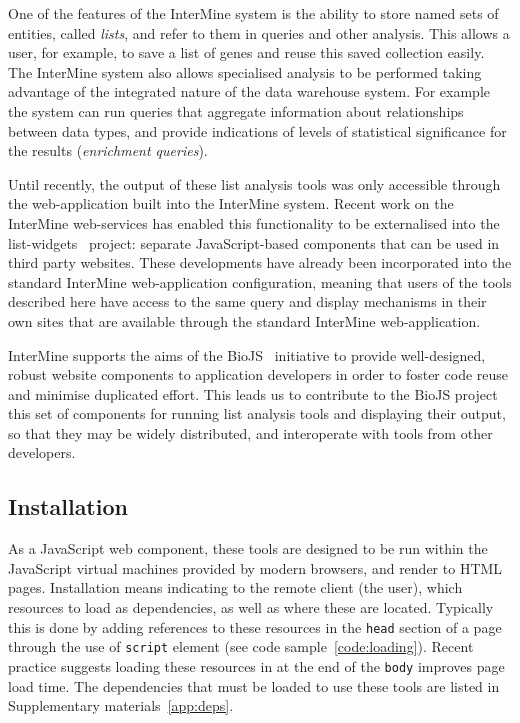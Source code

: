 \documentclass[10pt,a4paper,twocolumn]{article}
\begin{document}
One of the features of the InterMine system is the ability to store named sets
of entities, called \emph{lists}, and refer to them in queries and other
analysis. This allows a user, for example, to save a list of genes and reuse
this saved collection easily. The InterMine system also allows specialised
analysis to be performed taking advantage of the integrated nature of the data
warehouse system. For example the system can run queries that aggregate
information about relationships between data types, and provide indications of
levels of statistical significance for the results (\emph{enrichment queries}).

Until recently, the output of these list analysis tools was only accessible
through the web-application built into the InterMine system. Recent work on the
InterMine web-services has enabled this functionality to be externalised into
the list-widgets~\cite{site:list-widgets} project: separate JavaScript-based
components that can be used in third party websites.  These developments have
already been incorporated into the standard InterMine web-application
configuration, meaning that users of the tools described here have access to the
same query and display mechanisms in their own sites that are available through
the standard InterMine web-application.

InterMine supports the aims of the BioJS~\cite{biojs} initiative to provide
well-designed, robust website components to application developers in order to
foster code reuse and minimise duplicated effort. This leads us to contribute to
the BioJS project this set of components for running list analysis tools and
displaying their output, so that they may be widely distributed, and
interoperate with tools from other developers.

\subsection*{Installation}

As a JavaScript web component, these tools are designed to be run within the
JavaScript virtual machines provided by modern browsers, and render to HTML
pages. Installation means indicating to the remote client (the user), which
resources to load as dependencies, as well as where these are located. Typically
this is done by adding references to these resources in the \texttt{head}
section of a page through the use of \texttt{script} element (see code
sample~\ref{code:loading}). Recent practice suggests loading these resources in
at the end of the \texttt{body} improves page load time. The dependencies that
must be loaded to use these tools are listed in Supplementary
materials~\ref{app:deps}.
\end{document}
